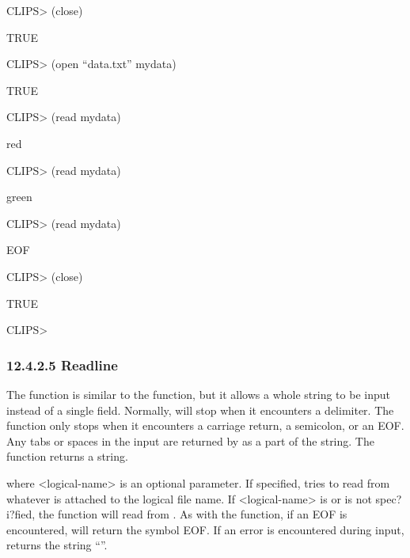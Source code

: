 \documentclass[letterpaper,10pt,english]{sphinxmanual}
\begin{document}
CLIPS\textgreater{} (close)

TRUE

CLIPS\textgreater{} (open “data.txt” mydata)

TRUE

CLIPS\textgreater{} (read mydata)

red

CLIPS\textgreater{} (read mydata)

green

CLIPS\textgreater{} (read mydata)

EOF

CLIPS\textgreater{} (close)

TRUE

CLIPS\textgreater{}


\subsubsection{12.4.2.5 Readline}
\label{\detokenize{actions:readline}}
The  function is similar to the  function, but it
allows a whole string to be input instead of a single field. Normally,
 will stop when it encounters a delimiter. The 
function only stops when it encounters a carriage return, a semicolon,
or an EOF. Any tabs or spaces in the input are returned by 
as a part of the string. The  function returns a string.


\begin{sphinxVerbatim}[commandchars=\\\{\}]
 \PYG{p}{[}\PYG{p}{]}
\end{sphinxVerbatim}

where \textless{}logical-name\textgreater{} is an optional parameter. If specified,
 tries to read from whatever is attached to the logical file
name. If \textless{}logical-name\textgreater{} is  or is not spec?i?fied, the function
will read from . As with the  function, if an EOF is
encountered,  will return the symbol EOF. If an error is
encountered during input,  returns the string “”.
\end{document}

